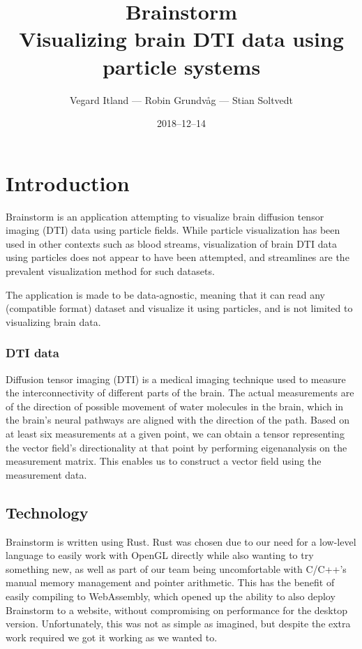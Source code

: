\documentclass{article}
\title{%
Brainstorm\\
\large Visualizing brain DTI data using particle systems}
\author{Vegard Itland --- Robin Grundvåg --- Stian Soltvedt}
\date{2018--12--14}
\begin{document}
\maketitle
{}

\section*{Introduction}

Brainstorm is an application attempting to visualize brain diffusion tensor imaging (DTI) data using particle fields. While particle visualization has been used in other contexts such as blood streams, visualization of brain DTI data using particles does not appear to have been attempted, and streamlines are the prevalent visualization method for such datasets.

The application is made to be data-agnostic, meaning that it can read any (compatible format) dataset and visualize it using particles, and is not limited to visualizing brain data.

\subsubsection*{DTI data}

Diffusion tensor imaging (DTI) is a medical imaging technique used to measure the interconnectivity of different parts of the brain. The actual measurements are of the direction of possible movement of water molecules in the brain, which in the brain's neural pathways are aligned with the direction of the path. Based on at least six measurements at a given point, we can obtain a tensor representing the vector field's directionality at that point by performing eigenanalysis on the measurement matrix. This enables us to construct a vector field using the measurement data.

\subsection*{Technology}

Brainstorm is written using Rust. Rust was chosen due to our need for a low-level language to easily work with OpenGL directly while also wanting to try something new, as well as part of our team being uncomfortable with C/C++'s manual memory management and pointer arithmetic. This has the benefit of easily compiling to WebAssembly, which opened up the ability to also deploy Brainstorm to a website, without compromising on performance for the desktop version. Unfortunately, this was not as simple as imagined, but despite the extra work required we got it working as we wanted to.
\end{document}
